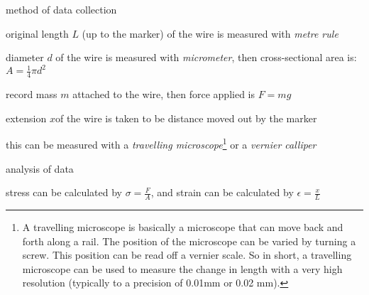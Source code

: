 \begin{figure}[ht]
	\centering
\end{figure}

\cmt method of data collection

\titem original length $L$ (up to the marker) of the wire is measured with \emph{metre rule}

\titem diameter $d$ of the wire is measured with \emph{micrometer}, then cross-sectional area is: $A = \frac{1}{4}\pi d^2$

\titem record mass $m$ attached to the wire, then force applied is $F=mg$

\titem extension $x$of the wire is taken to be distance moved out by the marker

this can be measured with a \emph{travelling microscope}\footnote{A travelling microscope is basically a microscope that can move back and forth along a rail. The position of the microscope can be varied by turning a screw. This position can be read off a vernier scale. So in short, a travelling microscope can be used to measure the change in length with a very high resolution (typically to a precision of 0.01mm or 0.02 mm).} or a \emph{vernier calliper}

\cmt analysis of data

stress can be calculated by $\sigma = \frac{F}{A}$, and strain can be calculated by $\epsilon = \frac{x}{L}$

